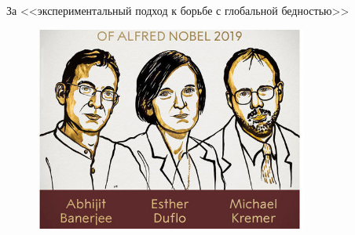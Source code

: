 \begin{frame}{За <<экспериментальный подход к борьбе с глобальной бедностью>>}
\begin{figure}
    \centering
    \includegraphics[width=0.8\textwidth]{Nobel 2019.jpg}
    \label{fig:my_label}
\end{figure}

\end{frame}